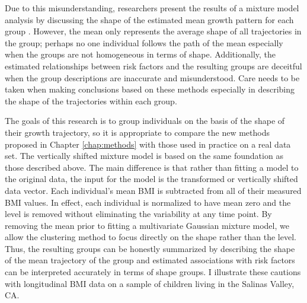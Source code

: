 Due to this misunderstanding, researchers present the results of a mixture model analysis by discussing the shape of the estimated mean growth pattern for each group \cite{pryor2011,carter2012}. However, the mean only represents the average shape of all trajectories in the group; perhaps no one individual follows the path of the mean especially when the groups are not homogeneous in terms of shape. Additionally, the estimated relationships between risk factors and the resulting groups are deceitful when the group descriptions are inaccurate and misunderstood. Care needs to be taken when making conclusions based on these methods especially in describing the shape of the trajectories within each group.  

The goals of this research is to group individuals on the basis of the shape of their growth trajectory, so it is appropriate to compare the new methods proposed in Chapter \ref{chap:methods} with those used in practice on a real data set. The vertically shifted mixture model is based on the same foundation as those described above. The main difference is that rather than fitting a model to the original data, the input for the model is the transformed or vertically shifted data vector. Each individual's mean BMI is subtracted from all of their measured BMI values. In effect, each individual is normalized to have mean zero and the level is removed without eliminating the variability at any time point. By removing the mean prior to fitting a multivariate Gaussian mixture model, we allow the clustering method to focus directly on the shape rather than the level. Thus, the resulting groups can be honestly summarized by describing the shape of the mean trajectory of the group and estimated associations with risk factors can be interpreted accurately in terms of shape groups. I illustrate these cautions with longitudinal BMI data on a sample of children living in the Salinas Valley, CA.


